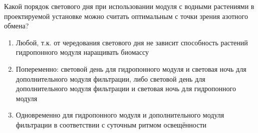 
Какой порядок светового дня при использовании модуля с водными растениями в проектируемой установке можно считать оптимальным с точки зрения азотного обмена?

\begin{enumerate}
    \item Любой, т.к. от чередования светового дня не зависит способность растений гидропонного модуля наращивать биомассу
    \item Попеременно: световой день для гидропонного модуля и световая ночь для дополнительного модуля фильтрации, либо световой день для дополнительного модуля фильтрации и световая ночь для гидропонного модуля
    \item Одновременно для гидропонного модуля и дополнительного модуля фильтрации в соответствии с суточным ритмом освещённости
   
\end{enumerate}